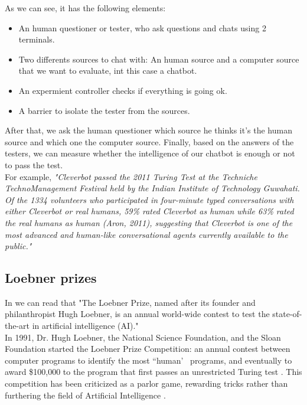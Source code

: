 \documentclass[12pt,twoside]{article}
\theoremstyle{plain}
\theoremstyle{definition}
\theoremstyle{remark}
\begin{document}
As we can see, it has the following elements:

\begin{itemize}
	\item An human questioner or tester, who ask questions and chats using 2 terminals.
	\item Two differents sources to chat with: An human source and a computer source that we want to evaluate, int this case a chatbot.
	\item An expermient controller checks if everything is going ok.
	\item A barrier to isolate the tester from the sources.
\end{itemize}

After that, we ask the human questioner which source he thinks it's the human source and which one the computer source. Finally, based on the answers of the testers, we can measure whether the intelligence of our chatbot is enough or not to pass the test.\\

For example, \textit{"Cleverbot passed the 2011 Turing Test at the Techniche TechnoManagement Festival held by the Indian Institute of Technology Guwahati. Of the 1334 volunteers who participated in four-minute typed conversations with either Cleverbot or real humans, 59\% rated Cleverbot as human while 63\% rated the real humans as human (Aron, 2011), suggesting that Cleverbot is one of the most advanced and human-like conversational agents currently available to the public."\cite{HILL2015245}}



\subsection{Loebner prizes}
	\label{sec:loebner}
	
	In \cite{loebner2011} we can read that "The Loebner Prize, named after its founder and philanthropist Hugh Loebner, is an annual world-wide contest to test the state-of-the-art in artificial intelligence (AI)."\\
	
In 1991, Dr. Hugh Loebner, the National Science Foundation, and the Sloan Foundation started the Loebner Prize Competition: an annual contest between computer programs to identify the most “human’~ programs, and eventually to award \$100,000 to the program that first passes an unrestricted Turing test \cite{epstein1992quest}. This competition has been criticized as a parlor game, rewarding tricks rather than furthering the field of Artificial Intelligence \cite{shieber1994lessons}. \\
\end{document}

